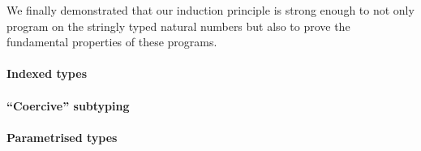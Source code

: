 \documentclass[twocolumn]{article}
\begin{document}
We finally demonstrated that our induction principle is strong enough to
not only program on the stringly typed natural numbers but also to prove the
fundamental properties of these programs.

\paragraph{Indexed types}

\paragraph{``Coercive'' subtyping}

\paragraph{Parametrised types}



\end{document}
